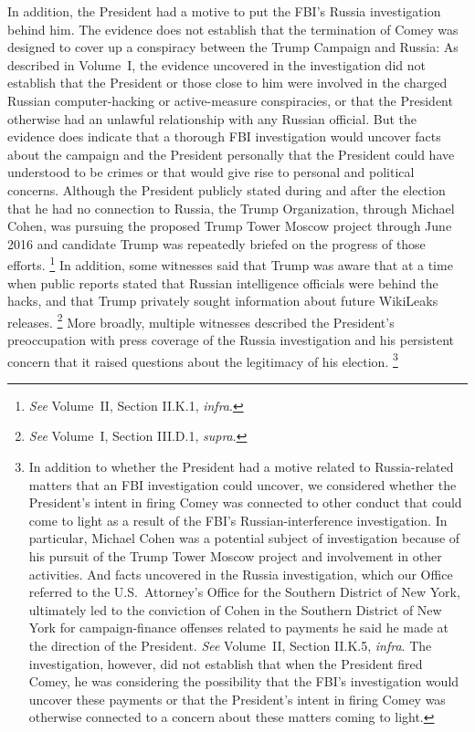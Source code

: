 In addition, the President had a motive to put the FBI's Russia investigation behind him.
The evidence does not establish that the termination of Comey was designed to cover up a conspiracy between the Trump Campaign and Russia: As described in Volume~I, the evidence uncovered in the investigation did not establish that the President or those close to him were involved in the charged Russian computer-hacking or active-measure conspiracies, or that the President otherwise had an unlawful relationship with any Russian official.
But the evidence does indicate that a thorough FBI investigation would uncover facts about the campaign and the President personally that the President could have understood to be crimes or that would give rise to personal and political concerns.
Although the President publicly stated during and after the election that he had no connection to Russia, the Trump Organization, through Michael Cohen, was pursuing the proposed Trump Tower Moscow project through June 2016 and candidate Trump was repeatedly briefed on the progress of those efforts.%
\footnote{\textit{See} Volume~II, Section II.K.1, \textit{infra}.}
In addition, some witnesses said that Trump was aware that 
at a time when public reports stated that Russian intelligence officials were behind the hacks, and that Trump privately sought information about future WikiLeaks releases.%
\footnote{\textit{See} Volume~I, Section III.D.1, \textit{supra}.}
More broadly, multiple witnesses described the President's preoccupation with press coverage of the Russia investigation and his persistent concern that it raised questions about the legitimacy of his election.%
\footnote{In addition to whether the President had a motive related to Russia-related matters that an FBI investigation could uncover, we considered whether the President's intent in firing Comey was connected to other conduct that could come to light as a result of the FBI's Russian-interference investigation.
In particular, Michael Cohen was a potential subject of investigation because of his pursuit of the Trump Tower Moscow project and involvement in other activities.
And facts uncovered in the Russia investigation, which our Office referred to the U.S.~Attorney's Office for the Southern District of New York, ultimately led to the conviction of Cohen in the Southern District of New York for campaign-finance offenses related to payments he said he made at the direction of the President.
\textit{See} Volume~II, Section II.K.5, \textit{infra}.
The investigation, however, did not establish that when the President fired Comey, he was considering the possibility that the FBI's investigation would uncover these payments or that the President's intent in firing Comey was otherwise connected to a concern about these matters coming to light.}

